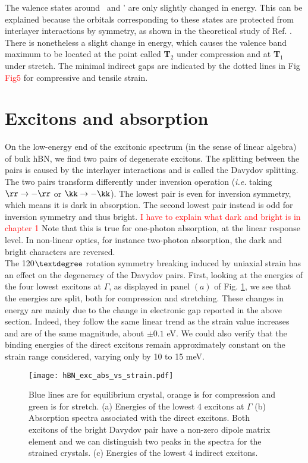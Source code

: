 The valence states around \KK~and \KK' are only slightly changed in energy. This can be explained because the orbitals corresponding to these states are protected from interlayer interactions by symmetry, as shown in the theoretical study of Ref. \cite{kang2016unified}. There is nonetheless a slight change in energy, which causes the valence band maximum to be located at the point called \textbf{T}$_2$ under compression and at \textbf{T}$_1$ under stretch. %
The minimal indirect gaps are indicated by the dotted lines in Fig \textcolor{red}{Fig5} for compressive and tensile strain.

%
\section{Excitons and absorption}
On the low-energy end of the excitonic spectrum (in the sense of linear algebra) of bulk \acrshort{hBN}, we find two pairs of degenerate excitons. The splitting between the pairs is caused by the interlayer interactions and is called the Davydov splitting.\cite{paleari2018excitons} The two pairs transform differently under inversion operation (\textit{i.e.} taking $\rr \to -\rr$ or $\kk \to -\kk$). The lowest pair is even for inversion symmetry, which means it is dark in absorption. The second lowest pair instead is odd for inversion symmetry and thus bright. \textcolor{red}{I have to explain what dark and bright is in chapter 1} 
Note that this is true for one-photon absorption, at the linear response level. In non-linear optics, for instance two-photon absorption, the dark and bright characters are reversed. \\
The 120$\textdegree$ rotation symmetry breaking induced by uniaxial strain has an effect on the degeneracy of the Davydov pairs. First, looking at the energies of the four lowest excitons at $\Gamma$, as displayed in panel $(a)$ of Fig. \ref{fig:exc_abs_vs_strain}, we see that the energies are split, both for compression and stretching. 
These changes in energy are mainly due to the change in electronic gap reported in the above section. Indeed, they follow the same linear trend as the strain value increases and are of the same magnitude, about $\pm 0.1$ eV. We could also verify that the binding energies of the direct excitons remain approximately constant on the strain range considered, varying only by 10 to 15 meV.
\begin{figure}[tbp]
	\vspace{0.2cm}
	\setcapindent{2em}
	\centering
	\texttt{[image: hBN\_exc\_abs\_vs\_strain.pdf]}
	\caption{Blue lines are for equilibrium crystal, orange is for compression and green is for stretch. (a) Energies of the lowest 4 excitons at $\Gamma$ (b) Absorption spectra associated with the direct excitons. Both excitons of the bright Davydov pair have a non-zero dipole matrix element and we can distinguish two peaks in the spectra for the strained crystals. (c) Energies of the lowest 4 indirect excitons.}
	\label{fig:exc_abs_vs_strain}
\end{figure}

